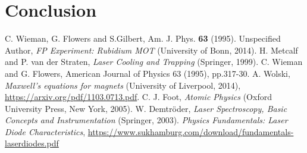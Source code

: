 \documentclass[twocolumn]{article}
\begin{document}
\section{Conclusion}
\begin{thebibliography}{9}
C. Wieman, G. Flowers and S.Gilbert, Am. J. Phys. \textbf{63} (1995).
Unspecified Author, \textsl{FP Experiment: Rubidium MOT} (University of Bonn, 2014).
H. Metcalf and P. van der Straten, \textsl{Laser Cooling and Trapping} (Springer, 1999).
C. Wieman and G. Flowers, American Journal of Physics 63 (1995), pp.317-30.
A. Wolski, \textsl{Maxwell's equations for magnets} (University of Liverpool, 2014), \url{https://arxiv.org/pdf/1103.0713.pdf}.
C. J. Foot, \textsl{Atomic Physics} (Oxford University Press, New York, 2005).
W. Demtröder, \textsl{Laser Spectroscopy, Basic Concepts and Instrumentation} (Springer, 2003).%
\textsl{Physics Fundamentals: Laser Diode Characteristics}, \url{https://www.sukhamburg.com/download/fundamentals-laserdiodes.pdf}

\end{thebibliography}
\end{document}
